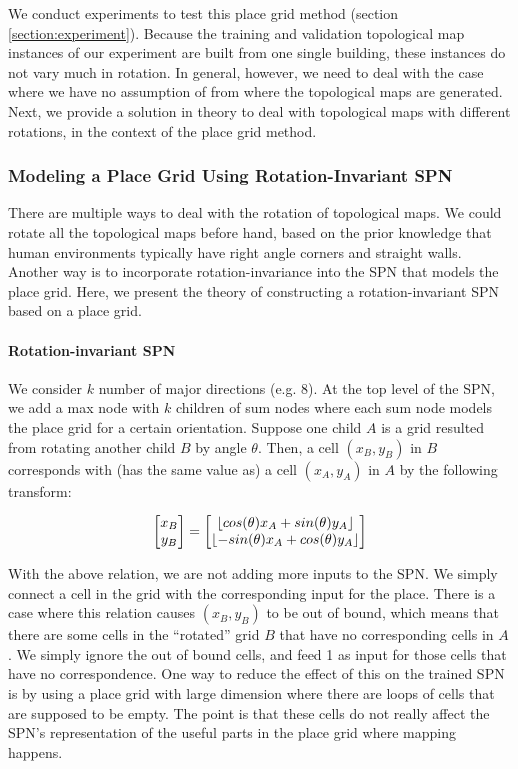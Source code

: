\documentclass[10pt, titlepage]{article}
\theoremstyle{definition}
\DeclarePairedDelimiter\floor{\lfloor}{\rfloor}
\begin{document}
We conduct experiments to test this place grid method (section \ref{section:experiment}). Because the training and validation topological map instances of our experiment are built from one single building, these instances do not vary much in rotation. In general, however, we need to deal with the case where we have no assumption of from where the topological maps are generated. Next, we provide a solution in theory to deal with topological maps with different rotations, in the context of the place grid method.

\subsubsection{Modeling a Place Grid Using Rotation-Invariant SPN}

There are multiple ways to deal with the rotation of topological maps. We could rotate all the topological maps before hand, based on the prior knowledge that human environments typically have right angle corners and straight walls. Another way is to incorporate rotation-invariance into the SPN that models the place grid. Here, we present the theory of constructing a rotation-invariant SPN based on a place grid.

\paragraph{Rotation-invariant SPN} We consider $k$ number of major directions (e.g. 8). At the top level of the SPN, we add a max node with $k$ children of sum nodes where each sum node models the place grid for a certain orientation. Suppose one child $A$ is a grid resulted from rotating another child $B$ by angle $\theta$. Then, a cell $(x_B, y_B)$ in $B$ corresponds with (has the same value as) a cell $(x_A, y_A)$ in $A$ by the following transform:

\begin{equation}
\begin{bmatrix}
x_B \\
y_B \\
\end{bmatrix}
=
\begin{bmatrix}
\floor{cos(\theta)x_A+sin(\theta)y_A}\\
\floor{-sin(\theta)x_A+cos(\theta)y_A}\\
\end{bmatrix}
\end{equation}

With the above relation, we are not adding more inputs to the SPN. We simply connect a cell in the grid with the corresponding input for the place. There is a case where this relation causes $(x_B, y_B)$ to be out of bound, which means that there are some cells in the ``rotated'' grid $B$ that have no corresponding cells in $A$. We simply ignore the out of bound cells, and feed 1 as input for those cells that have no correspondence. One way to reduce the effect of this on the trained SPN is by using a place grid with large dimension where there are loops of cells that are supposed to be empty. The point is that these cells do not really affect the SPN's representation of the useful parts in the place grid where mapping happens.
\end{document}
